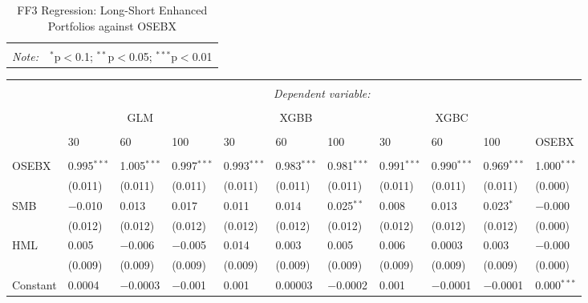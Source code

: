 \begin{appendices}
\begin{table}[H]
\begin{tabularx}{\textwidth}{XXXXXXXXXXl}
\hline 
\hline \\[-2ex] 
\textit{Note:}  & \multicolumn{10}{r}{$^{*}$p$<$0.1; $^{**}$p$<$0.05; $^{***}$p$<$0.01} \\ 
\end{tabularx}
\vspace{1em}
\caption{{FF3 Regression: Long-Short Enhanced Portfolios against OSEBX}} 
\label{FF3-long-short-enhanced-osebx} 
\end{table} 



\begin{table}[H] 
\centering 
\footnotesize
\begin{tabularx}{\textwidth}{XXXXXXXXXXl} 
\\[-2ex]\hline 
\hline \\[-2ex] 
 & \multicolumn{10}{c}{\textit{Dependent variable:}} \\ 
\cline{2-11} 
\\[-2ex] 
 & \multicolumn{3}{c}{GLM} & \multicolumn{3}{c}{XGBB} & \multicolumn{3}{c}{XGBC} & \\
 \cline{2-10}
 \\[-2ex] 
 & 30 & 60 & 100 & 30 & 60 & 100 & 30 & 60 & 100 & OSEBX \\ 
 \cline{2-10} \\
 OSEBX & 0.995$^{***}$ & 1.005$^{***}$ & 0.997$^{***}$ & 0.993$^{***}$ & 0.983$^{***}$ & 0.981$^{***}$ & 0.991$^{***}$ & 0.990$^{***}$ & 0.969$^{***}$ & 1.000$^{***}$ \\ 
  & (0.011) & (0.011) & (0.011) & (0.011) & (0.011) & (0.011) & (0.011) & (0.011) & (0.011) & (0.000) \\ 
 SMB & $-$0.010 & 0.013 & 0.017 & 0.011 & 0.014 & 0.025$^{**}$ & 0.008 & 0.013 & 0.023$^{*}$ & $-$0.000 \\ 
  & (0.012) & (0.012) & (0.012) & (0.012) & (0.012) & (0.012) & (0.012) & (0.012) & (0.012) & (0.000) \\ 
 HML & 0.005 & $-$0.006 & $-$0.005 & 0.014 & 0.003 & 0.005 & 0.006 & 0.0003 & 0.003 & $-$0.000 \\ 
  & (0.009) & (0.009) & (0.009) & (0.009) & (0.009) & (0.009) & (0.009) & (0.009) & (0.009) & (0.000) \\ 
 Constant & 0.0004 & $-$0.0003 & $-$0.001 & 0.001 & 0.00003 & $-$0.0002 & 0.001 & $-$0.0001 & $-$0.0001 & 0.000$^{***}$ \\ 

\end{tabularx}
\end{table}
\end{appendices}
